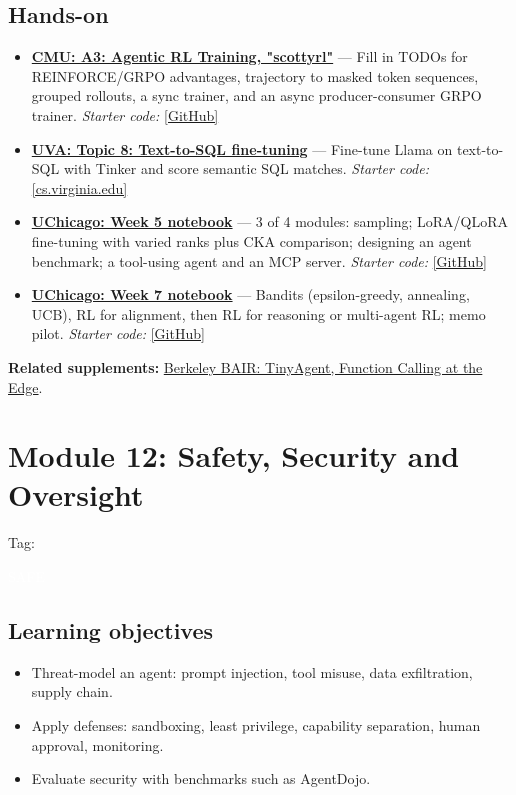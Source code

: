\documentclass[10pt,oneside]{report}
\newcommand{\tg}[1]{{\setlength{\fboxsep}{1.2pt}\colorbox{tag#1}{\kern1pt\textcolor{white}{\sffamily\bfseries\fontsize{5.5}{6}\selectfont\strut #1}\kern1.5pt}}}
\begin{document}
\section{Hands-on}
\begin{itemize}
\item \hyperlink{asg-CMU-3}{\textbf{CMU: A3: Agentic RL Training, "scottyrl"}} --- Fill in TODOs for REINFORCE/GRPO advantages, trajectory to masked token sequences, grouped rollouts, a sync trainer, and an async producer-consumer GRPO trainer. \textit{Starter code:} \href{https://github.com/cmu-agents/assignment-3}{[GitHub]}
\item \hyperlink{asg-UVA-8}{\textbf{UVA: Topic 8: Text-to-SQL fine-tuning}} --- Fine-tune Llama on text-to-SQL with Tinker and score semantic SQL matches. \textit{Starter code:} \href{https://www.cs.virginia.edu/\%7Ermw7my/Courses/AgenticAISpring2026/Topic8FineTuning/finetuning.html}{[cs.virginia.edu]}
\item \hyperlink{asg-UCHI-5}{\textbf{UChicago: Week 5 notebook}} --- 3 of 4 modules: sampling; LoRA/QLoRA fine-tuning with varied ranks plus CKA comparison; designing an agent benchmark; a tool-using agent and an MCP server. \textit{Starter code:} \href{https://github.com/KnowledgeLab/AI-Agents-for-Social-Science-and-Society-2026/blob/main/Tutorials-Homework_Notebooks/Week_5_2026.ipynb}{[GitHub]}
\item \hyperlink{asg-UCHI-7}{\textbf{UChicago: Week 7 notebook}} --- Bandits (epsilon-greedy, annealing, UCB), RL for alignment, then RL for reasoning or multi-agent RL; memo pilot. \textit{Starter code:} \href{https://github.com/KnowledgeLab/AI-Agents-for-Social-Science-and-Society-2026/blob/main/Tutorials-Homework_Notebooks/Week_7_RL.ipynb}{[GitHub]}
\end{itemize}
\textbf{Related supplements:} \hyperref[sup-tinyagent]{Berkeley BAIR: TinyAgent, Function Calling at the Edge}.
\chapter{Module 12: Safety, Security and Oversight}\hypertarget{mod-SAFE}{}
{\small Tag: \tg{SAFE}}
\section{Learning objectives}
\begin{itemize}
\item Threat-model an agent: prompt injection, tool misuse, data exfiltration, supply chain.
\item Apply defenses: sandboxing, least privilege, capability separation, human approval, monitoring.
\item Evaluate security with benchmarks such as AgentDojo.
\end{itemize}
\end{document}
